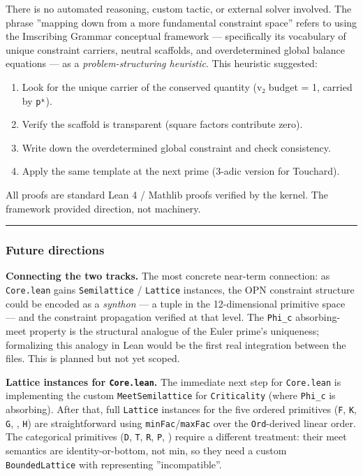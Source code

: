 \documentclass[12pt,a4paper]{article}
\begin{document}
There is no automated reasoning, custom tactic, or external solver involved. The phrase
''mapping down from a more fundamental constraint space'' refers to using the Imscribing Grammar
conceptual framework --- specifically its vocabulary of unique constraint carriers, neutral
scaffolds, and overdetermined global balance equations --- as a \emph{problem-structuring heuristic}.
This heuristic suggested:

\begin{enumerate}
    \item Look for the unique carrier of the conserved quantity (v₂ budget = 1, carried by \texttt{pᵏ}).
    \item Verify the scaffold is transparent (square factors contribute zero).
    \item Write down the overdetermined global constraint and check consistency.
    \item Apply the same template at the next prime (3-adic version for Touchard).
\end{enumerate}

All proofs are standard Lean 4 / Mathlib proofs verified by the kernel. The framework provided
direction, not machinery.

\begin{center}
\rule{0.5\textwidth}{0.4pt}
\end{center}

\subsubsection{Future directions}

\textbf{Connecting the two tracks.} The most concrete near-term connection: as \texttt{Core.lean} gains
\texttt{Semilattice} / \texttt{Lattice} instances, the OPN constraint structure could be encoded as a
\emph{synthon} --- a tuple in the 12-dimensional primitive space --- and the constraint propagation
verified at that level. The \texttt{Phi\_c} absorbing-meet property is the structural analogue of
the Euler prime's uniqueness; formalizing this analogy in Lean would be the first real
integration between the files. This is planned but not yet scoped.

\textbf{Lattice instances for \texttt{Core.lean}.} The immediate next step for \texttt{Core.lean} is implementing
the custom \texttt{MeetSemilattice} for \texttt{Criticality} (where \texttt{Phi\_c} is absorbing). After that, full
\texttt{Lattice} instances for the five ordered primitives (\texttt{F}, \texttt{K}, \texttt{G}, \texttt{\Omega}, \texttt{H}) are
straightforward using \texttt{minFac}/\texttt{maxFac} over the \texttt{Ord}-derived linear order. The categorical
primitives (\texttt{D}, \texttt{T}, \texttt{R}, \texttt{P}, \texttt{\Gamma}) require a different treatment: their meet semantics are
identity-or-bottom, not min, so they need a custom \texttt{BoundedLattice} with \texttt{\perp} representing
''incompatible''.
\end{document}
